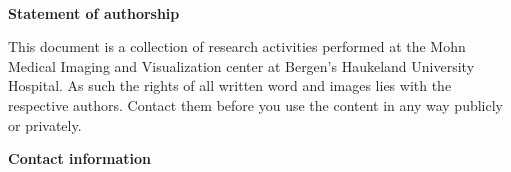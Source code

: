 \documentclass[11pt,fleqn]{book} %
\begin{document}
\renewcommand{\bibname}{References} %



\begingroup
\thispagestyle{empty}
\centering
\vspace*{11.3cm}
\par\normalfont\fontsize{35}{35}\sffamily\selectfont

\begin{center}

	
    
    \color{black}\par %
    
    \vspace*{0.5cm}
\end{center}

\endgroup



\newpage
~\vfill
\thispagestyle{empty}

\noindent \textbf{Statement of authorship}
\vspace{0.5cm}

\noindent This document is a collection of research activities performed at the Mohn Medical 
Imaging and Visualization center at Bergen's Haukeland University Hospital. As such the rights
of all written word and images lies with the respective authors. Contact them before you use
the content in any way publicly or privately.
\vspace{1cm}

\noindent \textbf{Contact information}
\vspace{0.5cm}
\end{document}
